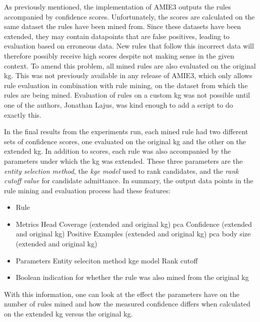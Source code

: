 As previously mentioned, the implementation of AMIE3 outputs the rules accompanied by confidence scores. Unfortunately, the scores are calculated on the same dataset the rules have been mined from. Since these datasets have been extended, they may contain datapoints that are false positives, leading to evaluation based on erroneous data. New rules that follow this incorrect data will therefore possibly receive high scores despite not making sense in the given context. To amend this problem, all mined rules are also evaluated on the original \gls{kg}.
This was not previously available in any release of AMIE3, which only allows rule evaluation in combination with rule mining, on the dataset from which the rules are being mined. Evaluation of rules on a custom \gls{kg} was not possible until one of the authors, Jonathan Lajus, was kind enough to add a script to do exactly this.

In the final results from the experiments run, each mined rule had two different sets of confidence scores, one evaluated on the original \gls{kg} and the other on the extended \gls{kg}. In addition to scores, each rule was also accompanied by the parameters under which the \gls{kg} was extended. These three parameters are the \textit{entity selection method}, the \textit{\gls{kge} model} used to rank candidates, and the \textit{rank cutoff value} for candidate admittance. In summary, the output data points in the rule mining and evaluation process had these features:
\begin{itemize}
    \item Rule
    \item Metrics
        \subitem Head Coverage (extended and original \gls{kg})
        \subitem \gls{pca} Confidence (extended and original \gls{kg})
        \subitem Positive Examples (extended and original \gls{kg})
        \subitem \gls{pca} body size (extended and original \gls{kg})
    \item Parameters
        \subitem Entity seleciton method
        \subitem \gls{kge} model
        \subitem Rank cutoff
    \item Boolean indication for whether the rule was also mined from the original \gls{kg}
\end{itemize}

With this information, one can look at the effect the parameters have on the number of rules mined and how the measured confidence differs when calculated on the extended \gls{kg} versus the original \gls{kg}.


